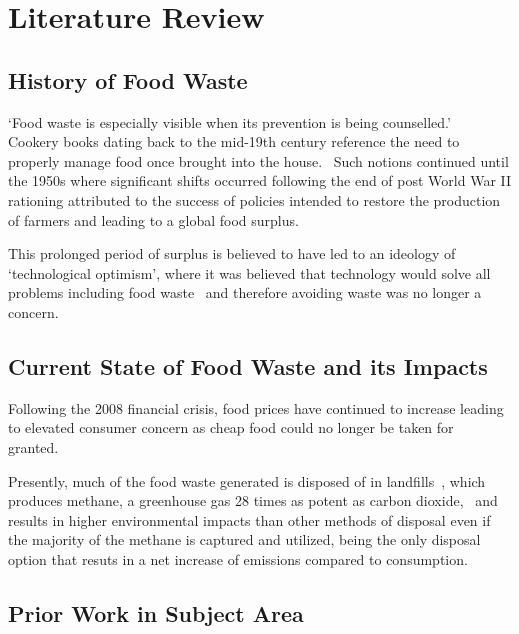 \section{Literature Review}

\subsection{History of Food Waste}

\enquote*{Food waste is especially visible when its prevention is being counselled.}~\cite{evans_brief_2012}
Cookery books dating back to the mid-19th century reference the need to properly manage food once brought
into the house.~\cite{beeton_mrs_1907} Such notions continued until the 1950s where significant shifts
occurred following the end of post World War II rationing attributed to the success of policies intended
to restore the production of farmers and leading to a global food surplus.~\cite{evans_brief_2012}

This prolonged period of surplus is believed to have led to an ideology of \enquote*{technological optimism},
where it was believed that technology would solve all problems including food waste~\cite{krier_-easy_1985} and
therefore avoiding waste was no longer a concern.

\subsection{Current State of Food Waste and its Impacts}

Following the 2008 financial crisis, food prices have continued to increase leading to elevated consumer concern
as cheap food could no longer be taken for granted.~\cite{evans_brief_2012}

Presently, much of the food waste generated is disposed of in landfills~\cite{iacovidou_food_2012}, which produces
methane, a greenhouse gas 28 times as potent as carbon dioxide,~\cite{marmier_methane_2020} and results in higher
environmental impacts than other methods of disposal even if the majority of the methane is captured and utilized,
being the only disposal option that resuts in a net increase of emissions compared to consumption.~\cite{moult_greenhouse_2018}

\subsection{Prior Work in Subject Area}
